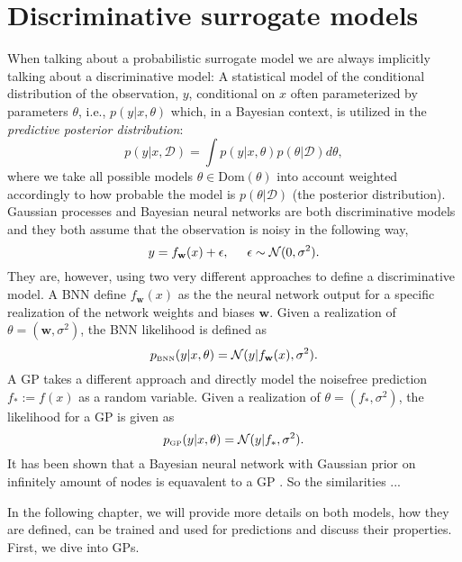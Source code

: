 \chapter{Discriminative surrogate models}

When talking about a probabilistic surrogate model we are always implicitly talking about a
discriminative model: A statistical model of the conditional distribution of the observation, $y$, 
conditional on $x$ often parameterized by parameters $\theta$, i.e., $p(y|x, \theta)$ 
which, in a Bayesian context, is utilized in the \textit{predictive posterior
distribution}:
$$p(y|x,\mathcal{D}) = \int p(y|x, \theta)p(\theta|\mathcal{D}) d\theta,$$ where we take all
possible models $\theta \in \text{Dom}(\theta)$ into account weighted accordingly to how probable
the model is $p(\theta|\mathcal{D})$ (the posterior distribution). Gaussian processes and Bayesian
neural networks are both discriminative models and they both assume that the observation is noisy in the
following way, 
$$y = f_{\textbf{w}}(x) + \epsilon, \hspace*{0.5cm} \epsilon \sim \mathcal{N}(0, \sigma^2).$$ They
are, however, using two very different approaches to define a discriminative model. A BNN define
$f_{\textbf{w}}(x)$ as the the neural network output for a specific realization of the network
weights and biases $\textbf{w}$. Given a realization of $\theta = (\textbf{w}, \sigma^2)$, the BNN
likelihood is defined as
$$p_{\text{\tiny BNN}} (y|x, \theta) = \mathcal{N}(y| f_{\textbf{w}}(x),\sigma^2).$$
A GP takes a different approach and directly model the noisefree prediction $f_* := f(x)$ as a random
variable. Given a realization of $\theta = (f_*,\sigma^2)$, the likelihood for a GP is given as
$$ p_{\text{\tiny GP}}(y|x, \theta) = \mathcal{N}(y| f_*,\sigma^2).$$
It has been shown that a Bayesian neural network with Gaussian prior on infinitely amount of nodes
is equavalent to a GP \cite{??}. So the similarities ... 


In the following chapter, we will provide more details on both models, how they are defined, can be trained
and used for predictions and discuss their properties. First, we dive into GPs.




